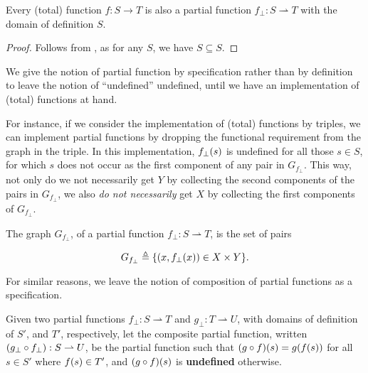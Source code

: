 \begin{corollary} Every (total) function $f : S \rightarrow T$ is also a
partial function $f_\bot : S \rightharpoonup T$ with the domain of definition
$S$. \end{corollary}

\begin{proof} Follows from , as for any $S$, we have
$S\subseteq S$.  \end{proof}

We give the notion of partial function by specification rather than by
definition to leave the notion of ``undefined'' undefined, until we have an
implementation of (total) functions at hand.

For instance, if we consider the implementation of (total) functions by
triples, we can implement partial functions by dropping the functional
requirement from the graph in the triple. In this implementation, $f_\bot\mathopen{}\left({s}\right)\mathclose{}$
is undefined for all those $s\in S$, for which $s$ does not occur as the first
component of any pair in $G_{f_\bot}$. This way, not only do we not necessarily
get $Y$ by collecting the second components of the pairs in $G_{f_\bot}$, we
also \emph{do not necessarily} get $X$ by collecting the first components of
$G_{f_\bot}$.

\begin{definition} The graph $G_{f_\bot}$, of a partial function $f_\bot : S
\rightharpoonup T$, is the set of pairs

$$G_{f_\bot} \triangleq \mathopen{}\left\{{\mathopen{}\left({x,f_\bot\mathopen{}\left({x}\right)\mathclose{}}\right)\mathclose{}\in X \times Y}\right\}\mathclose{}.$$

\end{definition}

For similar reasons, we leave the notion of composition of partial functions as
a specification.

\begin{specification} \label{spec:partial-composition} Given two partial
functions $f_\bot : S \rightharpoonup T$ and $g_\bot : T \rightharpoonup U$,
with domains of definition of $S'$, and $T'$, respectively, let the composite
partial function, written $\mathopen{}\left({g_\bot \circ f_\bot}\right)\mathclose{} : S \rightharpoonup U$, be
the partial function such that $\mathopen{}\left({g \circ f}\right)\mathclose{}\mathopen{}\left({s}\right)\mathclose{} = g\mathopen{}\left({f\mathopen{}\left({s}\right)\mathclose{}}\right)\mathclose{}$ for all $s\in
S'$ where $f\mathopen{}\left({s}\right)\mathclose{} \in T'$, and $\mathopen{}\left({g \circ f}\right)\mathclose{}\mathopen{}\left({s}\right)\mathclose{}$ is \textbf{undefined}
otherwise.  \end{specification}


